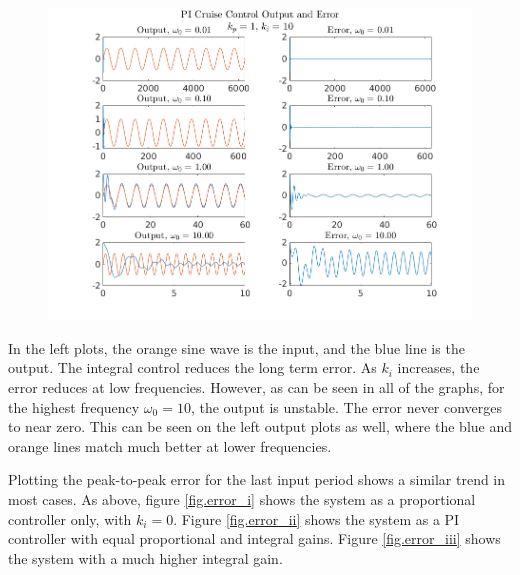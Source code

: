 \documentclass[11pt]{article}
\theoremstyle{definition}
\begin{document}
\begin{enumerate}
\begin{enumerate}
        \begin{figure}
            \centering
            \includegraphics{ES155P1_4ciii_output.png}
            \caption{}
            \label{fig.output_iii}
        \end{figure}

        In the left plots, the orange sine wave is the input, and the blue line is the output.  The integral control reduces the long term error.  As $k_i$ increases, the error reduces at low frequencies.  However, as can be seen in all of the graphs, for the highest frequency $\omega_0 = 10$, the output is unstable.  The error never converges to near zero.  This can be seen on the left output plots as well, where the blue and orange lines match much better at lower frequencies.

        Plotting the peak-to-peak error for the last input period shows a similar trend in most cases.  As above, figure \ref{fig.error_i} shows the system as a proportional controller only, with $k_i = 0$.  Figure \ref{fig.error_ii} shows the system as a PI controller with equal proportional and integral gains.  Figure \ref{fig.error_iii} shows the system with a much higher integral gain.


\end{enumerate}
\end{enumerate}
\end{document}
